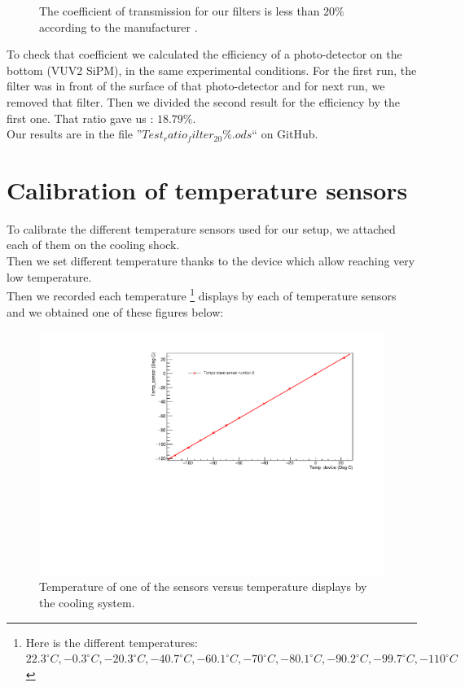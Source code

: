 \documentclass[a4paper, 11pt]{report}%
\begin{document}
  \begin{figure}[!hbtp]
    \centering
    \caption{The coefficient of transmission for our filters is less than $20\%$ according to the manufacturer \cite{ref:phelham_filter}.}
    \label{fig:transmissin_filter}
  \end{figure}

    To check that coefficient we calculated the efficiency of a photo-detector on the bottom (VUV2 SiPM), in the same experimental 
    conditions. For the first
    run, the filter was in front of the surface of that photo-detector and for next run, we removed that filter. Then we divided the second 
    result for the efficiency by the first one. That ratio gave us : $18.79\%$.
    \\
    
    Our results are in the file ''$Test_ratio_filter_20\%.ods$`` on GitHub. 
    
  \section{Calibration of temperature sensors}
  
  To calibrate the different temperature sensors used for our setup, we attached each of them on the cooling shock.\\
  Then we set different temperature thanks to the device which allow reaching very low temperature.\\
  Then we recorded each temperature \footnote{Here is the different temperatures: $22.3^\circ C, -0.3^\circ C, -20.3^\circ C, -40.7^\circ C, 
  -60.1^\circ C, 
  -70^\circ C, -80.1^\circ C, -90.2^\circ C, -99.7^\circ C, -110^\circ C$} displays by each of temperature sensors and we 
  obtained one of these figures below:
  
  \begin{figure}[!hbtp]
    \centering
    \includegraphics[totalheight=0.5\textwidth,trim=.5cm 0cm 1.8cm 0.9cm, clip=true]{../Pictures/temp_sensor_2.pdf} 
    \caption{Temperature of one of the sensors versus temperature displays by the cooling system.}
    \label{fig:temp_sensor_2}
  \end{figure}
  
\end{document}
